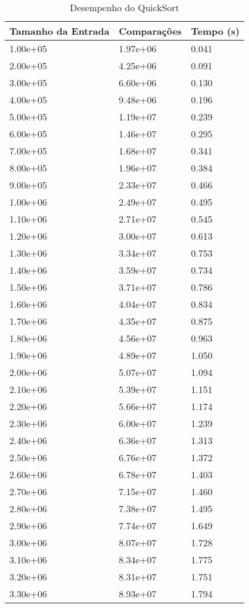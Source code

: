 \begin{table}
\caption{Desempenho do QuickSort}
\label{tab:quicksort}
\begin{tabular}{lll}
\toprule
Tamanho da Entrada & Comparações & Tempo (s) \\
\midrule
1.00e+05 & 1.97e+06 & 0.041 \\
2.00e+05 & 4.25e+06 & 0.091 \\
3.00e+05 & 6.60e+06 & 0.130 \\
4.00e+05 & 9.48e+06 & 0.196 \\
5.00e+05 & 1.19e+07 & 0.239 \\
6.00e+05 & 1.46e+07 & 0.295 \\
7.00e+05 & 1.68e+07 & 0.341 \\
8.00e+05 & 1.96e+07 & 0.384 \\
9.00e+05 & 2.33e+07 & 0.466 \\
1.00e+06 & 2.49e+07 & 0.495 \\
1.10e+06 & 2.71e+07 & 0.545 \\
1.20e+06 & 3.00e+07 & 0.613 \\
1.30e+06 & 3.34e+07 & 0.753 \\
1.40e+06 & 3.59e+07 & 0.734 \\
1.50e+06 & 3.71e+07 & 0.786 \\
1.60e+06 & 4.04e+07 & 0.834 \\
1.70e+06 & 4.35e+07 & 0.875 \\
1.80e+06 & 4.56e+07 & 0.963 \\
1.90e+06 & 4.89e+07 & 1.050 \\
2.00e+06 & 5.07e+07 & 1.094 \\
2.10e+06 & 5.39e+07 & 1.151 \\
2.20e+06 & 5.66e+07 & 1.174 \\
2.30e+06 & 6.00e+07 & 1.239 \\
2.40e+06 & 6.36e+07 & 1.313 \\
2.50e+06 & 6.76e+07 & 1.372 \\
2.60e+06 & 6.78e+07 & 1.403 \\
2.70e+06 & 7.15e+07 & 1.460 \\
2.80e+06 & 7.38e+07 & 1.495 \\
2.90e+06 & 7.74e+07 & 1.649 \\
3.00e+06 & 8.07e+07 & 1.728 \\
3.10e+06 & 8.34e+07 & 1.775 \\
3.20e+06 & 8.31e+07 & 1.751 \\
3.30e+06 & 8.93e+07 & 1.794 \\

\end{tabular}
\end{table}
